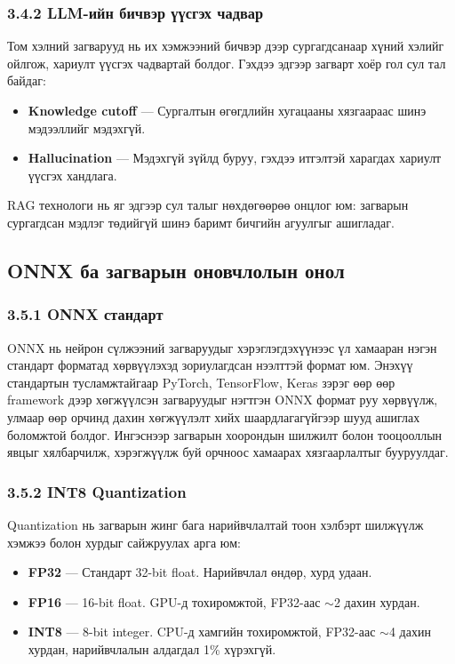 \documentclass[11pt,a4paper]{article}
\begin{document}
\subsubsection*{3.4.2 LLM-ийн бичвэр үүсгэх чадвар}

Том хэлний загварууд нь их хэмжээний бичвэр дээр сургагдсанаар хүний хэлийг ойлгож, хариулт үүсгэх чадвартай болдог. Гэхдээ эдгээр загварт хоёр гол сул тал байдаг:

\begin{itemize}
    \item \textbf{Knowledge cutoff} --- Сургалтын өгөгдлийн хугацааны хязгаараас шинэ мэдээллийг мэдэхгүй.
    \item \textbf{Hallucination} --- Мэдэхгүй зүйлд буруу, гэхдээ итгэлтэй харагдах хариулт үүсгэх хандлага.
\end{itemize}

RAG технологи нь яг эдгээр сул талыг нөхдөгөөрөө онцлог юм: загварын сургагдсан мэдлэг төдийгүй шинэ баримт бичгийн агуулгыг ашигладаг.

\subsection{ONNX ба загварын оновчлолын онол}

\subsubsection*{3.5.1 ONNX стандарт}

ONNX нь нейрон сүлжээний загваруудыг хэрэглэгдэхүүнээс үл хамааран нэгэн стандарт форматад хөрвүүлэхэд зориулагдсан нээлттэй формат юм. Энэхүү стандартын тусламжтайгаар PyTorch, TensorFlow, Keras зэрэг өөр өөр framework дээр хөгжүүлсэн загваруудыг нэгтгэн ONNX формат руу хөрвүүлж, улмаар өөр орчинд дахин хөгжүүлэлт хийх шаардлагагүйгээр шууд ашиглах боломжтой болдог. Ингэснээр загварын хоорондын шилжилт болон тооцооллын явцыг хялбарчилж, хэрэгжүүлж буй орчноос хамаарах хязгаарлалтыг бууруулдаг.
\subsubsection*{3.5.2 INT8 Quantization}

Quantization нь загварын жинг бага нарийвчлалтай тоон хэлбэрт шилжүүлж хэмжээ болон хурдыг сайжруулах арга юм:

\begin{itemize}
    \item \textbf{FP32} --- Стандарт 32-bit float. Нарийвчлал өндөр, хурд удаан.
    \item \textbf{FP16} --- 16-bit float. GPU-д тохиромжтой, FP32-аас $\sim$2 дахин хурдан.
    \item \textbf{INT8} --- 8-bit integer. CPU-д хамгийн тохиромжтой, FP32-аас $\sim$4 дахин хурдан, нарийвчлалын алдагдал 1\% хүрэхгүй.
\end{itemize}
\end{document}
